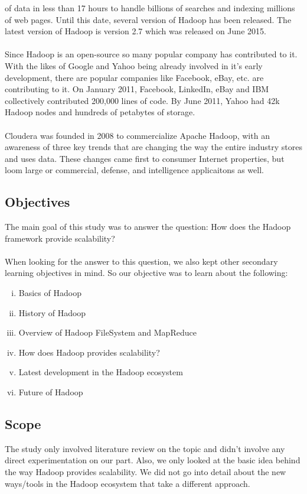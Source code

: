 \documentclass[a4paper,12pt,oneside]{report}
\begin{document}
of data in less than 17 hours to handle billions of searches and indexing millions of web pages.
Until this date, several version of Hadoop has been released. The latest version of Hadoop is version 2.7 which was released on June 2015.\\
\\
Since Hadoop is an open-source so many popular company has contributed to it. With the likes of Google and Yahoo being already involved in it's early
development, there are popular companies like Facebook, eBay, etc. are contributing to it. On January 2011, Facebook, LinkedIn, eBay and IBM collectively contributed 200,000 lines of code. By June 2011, Yahoo had 
42k Hadoop nodes and hundreds of petabytes of storage.\cite{Wikiapache}\\
\\
Cloudera was founded in 2008 to commercialize Apache Hadoop, with an awareness of three key trends that are changing the way the entire industry stores and uses data. These changes came first to consumer Internet properties, but loom large or commercial, defense, and
intelligence applicaitons as well.

\subsection{Objectives}
The main goal of this study was to answer the question: How does the Hadoop framework
provide scalability?\\
\\
When looking for the answer to this question, we also kept other secondary learning
objectives in mind. So our objective was to learn about the following:
\begin{enumerate}[(i)]
        \item Basics of Hadoop
        \item History of Hadoop
        \item Overview of Hadoop FileSystem and MapReduce
        \item How does Hadoop provides scalability?
        \item Latest development in the Hadoop ecosystem
        \item Future of Hadoop
\end{enumerate}

\subsection{Scope}
The study only involved literature review on the topic and didn't involve any direct experimentation on our part.
Also, we only looked at the basic idea behind the way Hadoop provides scalability. We did not go into detail 
about the new ways/tools in the Hadoop ecosystem that take a different approach.
\newpage
\end{document}
